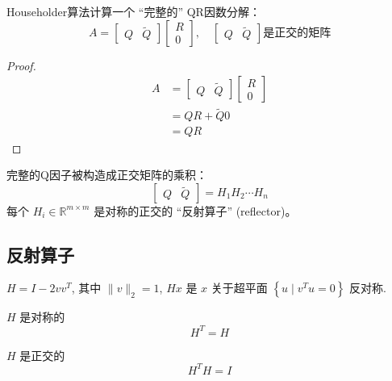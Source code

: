 Householder算法计算一个 “完整的” QR因数分解：
$$ A=\left[\begin{array}{ll}Q & \tilde{Q}\end{array}\right]\left[\begin{array}{l}R \\ 0\end{array}\right], \quad\left[\begin{array}{ll}Q & \tilde{Q}\end{array}\right]  是正交的矩阵$$

\begin{proof}
    $$
    \begin{aligned}
        A&=\left[\begin{array}{ll}Q & \tilde{Q}\end{array}\right]\left[\begin{array}{l}R \\ 0\end{array}\right]\\
        &=QR + \tilde{Q} 0 \\ 
        & = QR
    \end{aligned}
    $$
\end{proof}

完整的Q因子被构造成正交矩阵的乘积：
$$
\left[\begin{array}{ll}
Q & \tilde{Q}
\end{array}\right]=H_{1} H_{2} \cdots H_{n}
$$
每个 $ H_{i} \in \mathbb{R}^{m \times m} $ 是对称的正交的 “反射算子” (reflector)。


\subsection{反射算子}

\begin{theorem}
    $ H=I-2 v v^{T} $, 其中 $ \|v\|_{2}=1 $, $ H x $ 是 $ x $ 关于超平面 $ \left\{u \mid v^{T} u=0\right\} $ 反对称.

    $ H $ 是对称的 
    $$ H^{T}=H $$

$ H $ 是正交的 
$$ H^{T} H=I $$
\end{theorem}
    





